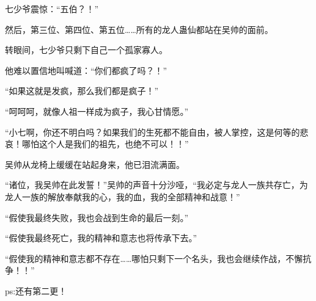 \begin{this_body}
七少爷震惊：“五伯？！”

然后，第三位、第四位、第五位……所有的龙人蛊仙都站在吴帅的面前。

转眼间，七少爷只剩下自己一个孤家寡人。

他难以置信地叫喊道：“你们都疯了吗？！”

“如果这就是发疯，那么我们都是疯子！”

“呵呵呵，就像人祖一样成为疯子，我心甘情愿。”

“小七啊，你还不明白吗？如果我们的生死都不能自由，被人掌控，这是何等的悲哀！哪怕这个人是我们的祖先，也绝不可以！！”

吴帅从龙椅上缓缓在站起身来，他已泪流满面。

“诸位，我吴帅在此发誓！”吴帅的声音十分沙哑，“我必定与龙人一族共存亡，为龙人一族的解放奉献我的心，我的血，我的全部精神和战意！”

“假使我最终失败，我也会战到生命的最后一刻。”

“假使我最终死亡，我的精神和意志也将传承下去。”

“假使我的精神和意志都不存在……哪怕只剩下一个名头，我也会继续作战，不懈抗争！！”

ps:还有第二更！

\end{this_body}

